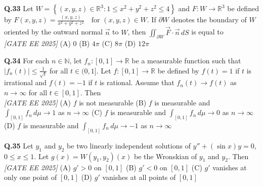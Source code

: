 \documentclass[11pt]{article}
\begin{document}
\begin{flushleft}
\textbf{Q.33} Let $W = \left\{(x, y, z) \in \mathbb{R}^3 : 1 \leq x^2 + y^2 + z^2 \leq 4 \right\}$ and $F : W \rightarrow \mathbb{R}^3$ be defined by \newline
\hspace*{2em} $F(x, y, z) = \frac{(x, y, z)}{x^2 + y^2 + z^2} \quad \text{for } (x, y, z) \in W$. \newline
If $\partial W$ denotes the boundary of $W$ oriented by the outward normal $\vec{n}$ to $W$, then $\iint_{\partial W} \vec{F} \cdot \vec{n} \, dS$ is equal to
\\[1ex] \textit{[GATE EE 2025]}
\newline
(A) 0 \hspace{3em} (B) $4\pi$ \hspace{3em} (C) $8\pi$ \hspace{3em} (D) $12\pi$ \newline
\end{flushleft}

\begin{flushleft}
\textbf{Q.34} For each $n \in \mathbb{N}$, let $f_n : [0,1] \rightarrow \mathbb{R}$ be a measurable function such that $|f_n(t)| \leq \frac{1}{\sqrt{t}}$ for all $t \in (0,1]$. Let $f : [0,1] \rightarrow \mathbb{R}$ be defined by $f(t) = 1$ if $t$ is irrational and $f(t) = -1$ if $t$ is rational. Assume that $f_n(t) \rightarrow f(t)$ as $n \rightarrow \infty$ for all $t \in [0,1]$. Then
\\[1ex] \textit{[GATE EE 2025]}
\newline
(A) $f$ is not measurable \newline
(B) $f$ is measurable and $\int_{[0,1]} f_n \, d\mu \to 1$ as $n \to \infty$ \newline
(C) $f$ is measurable and $\int_{[0,1]} f_n \, d\mu \to 0$ as $n \to \infty$ \newline
(D) $f$ is measurable and $\int_{[0,1]} f_n \, d\mu \to -1$ as $n \to \infty$ \newline
\end{flushleft}

\begin{flushleft}
\textbf{Q.35} Let $y_1$ and $y_2$ be two linearly independent solutions of \newline
\hspace*{2em} $y'' + (\sin x) y = 0$, \quad $0 \leq x \leq 1$. \newline
Let $g(x) = W(y_1, y_2)(x)$ be the Wronskian of $y_1$ and $y_2$. Then 
\\[1ex] \textit{[GATE EE 2025]}
\newline
(A) $g' > 0$ on $[0,1]$ \hspace{2em} (B) $g' < 0$ on $[0,1]$ \newline
(C) $g'$ vanishes at only one point of $[0,1]$ \hspace{2em} (D) $g'$ vanishes at all points of $[0,1]$ \newline
\end{flushleft}
\end{document}
